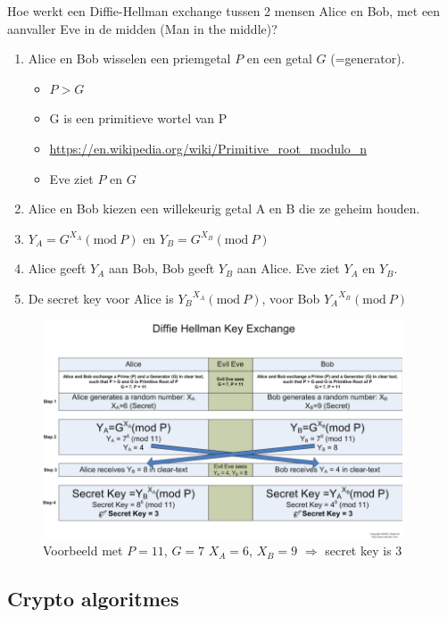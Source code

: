 \documentclass{article}
\begin{document}
Hoe werkt een Diffie-Hellman exchange tussen 2 mensen Alice en Bob, met een aanvaller Eve in de midden (Man in the middle)?

\begin{enumerate}
    \item Alice en Bob wisselen een priemgetal $P$ en een getal $G$ (=generator).
    \begin{itemize}
        \item $P > G$
        \item G is een primitieve wortel van P
        \item \url{https://en.wikipedia.org/wiki/Primitive\_root\_modulo\_n}
        \item Eve ziet $P$ en $G$
    \end{itemize} 
    \item Alice en Bob kiezen een willekeurig getal A en B die ze geheim houden.
    \item $Y_A = G^{X_A} (\mathrm{mod}\ P)$ en $Y_B = G^{X_B}(\mathrm{mod}\ P)$
    \item Alice geeft $Y_A$ aan Bob, Bob geeft $Y_B$ aan Alice. Eve ziet $Y_A$ en $Y_B$.
    \item De secret key voor Alice is ${Y_B}^{X_A} (\mathrm{mod}\ P)$, voor Bob ${Y_A}^{X_B} (\mathrm{mod}\ P)$
\end{enumerate}

\begin{figure}[H]
    \centering
    \includegraphics[width=0.95\textwidth]{diffie-hellman.png}
    \caption{Voorbeeld met $P=11$, $G=7$ $X_A = 6$, $X_B = 9$ $\Rightarrow$ secret key is $3$}
\end{figure}

\subsection{Crypto algoritmes}
\end{document}
